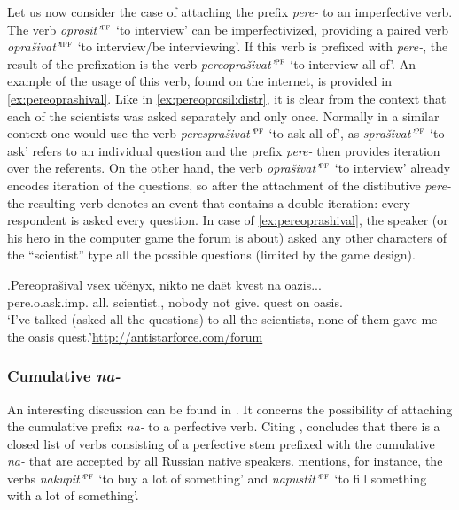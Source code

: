 Let us now consider the case of attaching the prefix \textit{pere-} to an imperfective verb. The verb \textit{oprosit'}$^{\textsc{pf}}$ `to interview' can be imperfectivized, providing a paired verb \textit{opra\v{s}ivat'}$^{\textsc{ipf}}$ `to interview/be interviewing'. If this verb is prefixed with \textit{pere-}, the result of the prefixation is the verb \textit{pereopra\v{s}ivat'}$^{\textsc{pf}}$ `to interview all of'. An example of the usage of this verb, found on the internet, is provided in \ref{ex:pereoprashival}. Like in \ref{ex:pereoprosil:distr}, it is clear from the context that each of the scientists was asked separately and only once. Normally in a similar context one would use the verb \textit{perespra\v{s}ivat'}$^{\textsc{pf}}$ `to ask all of', as \textit{spra\v{s}ivat'}$^{\textsc{pf}}$ `to ask' refers to an individual question and the prefix \textit{pere-} then provides iteration over the referents. On the other hand, the verb \textit{opra\v{s}ivat'}$^{\textsc{pf}}$ `to interview' already encodes iteration of the questions, so after the attachment of the distibutive \textit{pere-} the resulting verb denotes an event that contains a double iteration: every respondent is asked every question. In case of \ref{ex:pereoprashival}, the speaker (or his hero in the computer game the forum is about) asked any other characters of the ``scientist'' type all the possible questions (limited by the game design).

\exg.\label{ex:pereoprashival}Pereopra\v{s}ival vsex u\v{c}\"{e}nyx, nikto ne da\"{e}t kvest na oazis...\\
pere.o.ask.imp. all. scientist., nobody not give. quest on oasis.\\
\trans `I've talked (asked all the questions) to all the scientists, none of them gave me the oasis quest.'\hbox{}\hfill\hbox{\url{http://antistarforce.com/forum}}

\subsubsection{Cumulative \textit{na-}}
An interesting discussion can be found in \citet{Tatevosov:13a}. It concerns the possibility of attaching the cumulative prefix \textit{na-} to a perfective verb. Citing \citet{Zaliznjak:03}, \citet{Tatevosov:13a} concludes that there is a closed list of verbs consisting of a perfective stem prefixed with the cumulative \textit{na-} that are accepted by all Russian native speakers. \citet{Tatevosov:13a} mentions, for instance, the verbs \textit{nakupit'}$^{\textsc{pf}}$ `to buy a lot of something' and \textit{napustit'}$^{\textsc{pf}}$ `to fill something with a lot of something'. 

